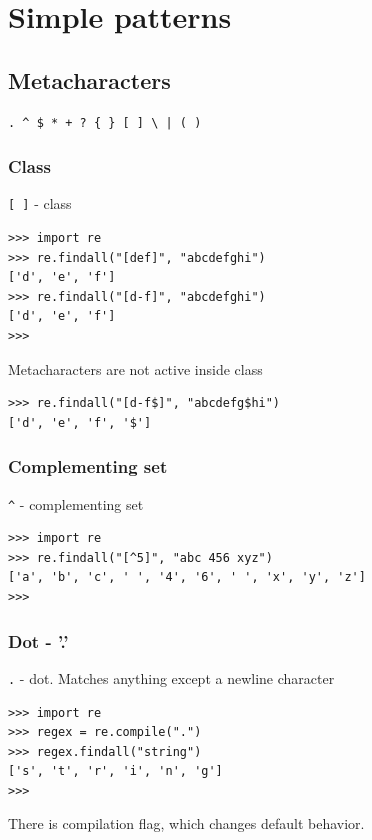 \documentclass{beamer}
\begin{document}
\section{Simple patterns}
\subsection{Metacharacters}
\begin{frame}[fragile]
\begin{verbatim}
. ^ $ * + ? { } [ ] \ | ( )
\end{verbatim}
\end{frame}

\subsubsection{Class}
\begin{frame}[fragile]
\verb/[ ]/ - class
\begin{lstlisting}
>>> import re
>>> re.findall("[def]", "abcdefghi")
['d', 'e', 'f']
>>> re.findall("[d-f]", "abcdefghi")
['d', 'e', 'f']
>>>
\end{lstlisting}
\pause
Metacharacters are not active inside class \\
\begin{lstlisting}
>>> re.findall("[d-f$]", "abcdefg$hi")
['d', 'e', 'f', '$']
\end{lstlisting}
\end{frame}

\subsubsection{Complementing set}
\begin{frame}[fragile]
\verb/^/ - complementing set
\begin{lstlisting}
>>> import re
>>> re.findall("[^5]", "abc 456 xyz")
['a', 'b', 'c', ' ', '4', '6', ' ', 'x', 'y', 'z']
>>>
\end{lstlisting}
\end{frame}

\subsubsection{Dot - '.'}
\begin{frame}[fragile]
\verb/./ - dot. Matches anything except a newline character
\begin{lstlisting}
>>> import re
>>> regex = re.compile(".")
>>> regex.findall("string")
['s', 't', 'r', 'i', 'n', 'g']
>>>
\end{lstlisting}
\pause
There is compilation flag, which changes default behavior.
\end{frame}
\end{document}

